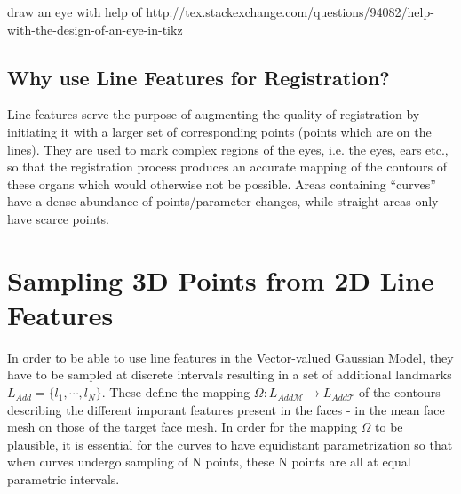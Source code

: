 
draw an eye with help of http://tex.stackexchange.com/questions/94082/help-with-the-design-of-an-eye-in-tikz

\subsection{Why use Line Features for Registration?} 
Line features serve the purpose of augmenting the quality of registration by initiating it with a larger set of corresponding points (points which are on the lines). They are used to mark complex regions of the eyes, i.e. the eyes, ears etc., so that the registration process produces an accurate mapping of the contours of these organs which would otherwise not be possible.  Areas containing ``curves'' have a dense abundance of points/parameter changes, while straight areas only have scarce points.  

\section{Sampling 3D Points from 2D Line Features} 
In order to be able to use line features in the Vector-valued Gaussian Model, they have to be sampled at discrete intervals resulting in a set of additional landmarks $L_{Add} = \{l_{1}, \cdots, l_{N}\}$. These define the mapping $\Omega:L_{Add\mathcal{M}} \rightarrow L_{Add\mathcal{T}}$ of the contours - describing the different imporant features present in the faces - in the mean face mesh on those of the target face mesh. In order for the mapping $\Omega$ to be plausible, it is essential
for the curves to have equidistant parametrization so that when curves undergo sampling of N points, these N points are all at equal parametric intervals.

